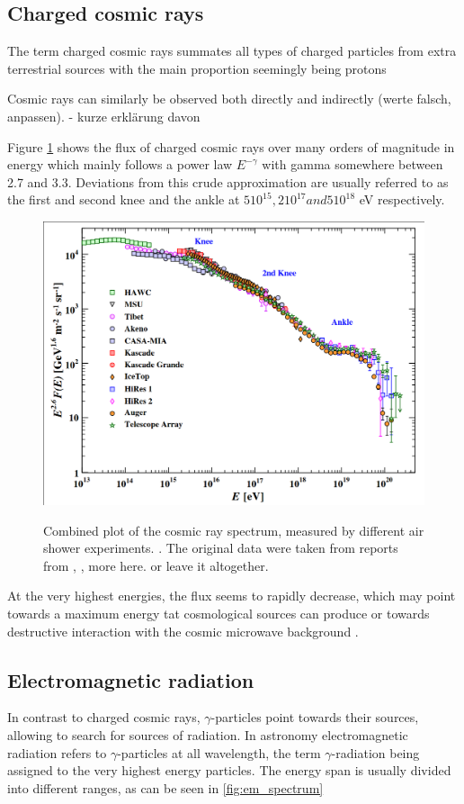 \subsection{Charged cosmic rays}
The term charged cosmic rays summates all types of charged particles from
extra terrestrial sources with the main proportion seemingly being protons
\cite{something something}


Cosmic rays can similarly be observed both directly and indirectly (werte falsch, anpassen).
- kurze erklärung davon


Figure \ref{fig:cr_spectrum} shows the flux of charged cosmic rays over 
many orders of magnitude in energy which mainly follows 
a power law $E^{-\gamma}$ with gamma somewhere between 
2.7 and 3.3. Deviations from this crude approximation are 
usually referred to as the first and second knee and the ankle 
at $5 10^{15}, 2 10^{17} and 5 10^{18}$ eV respectively.

\begin{figure}
	\includegraphics[width=.8\textwidth]{images/cr_spectrum.png}
	\label{fig:cr_spectrum}
	\caption{Combined plot of the cosmic ray spectrum, measured by different air shower experiments. \cite{pdg2019}. 
		The original data were taken from reports from \cite{Alfaro:2017cwx}, 
		\cite{1991ICRC....2...85F}, more here. or leave it altogether.
	}
\end{figure}


At the very highest energies, the flux seems to rapidly decrease, which may point towards a maximum energy
tat cosmological sources can produce or towards destructive interaction with 
the cosmic microwave background \cite{bookap}.

\subsection{Electromagnetic radiation}
In contrast to charged cosmic rays, $\gamma$-particles point towards
their sources, allowing to search for sources of radiation.
In astronomy electromagnetic radiation refers to $\gamma$-particles at all wavelength,
the term $\gamma$-radiation being assigned to the very highest energy particles.
The energy span is usually divided into different ranges, as can be seen in \ref{fig:em_spectrum}

